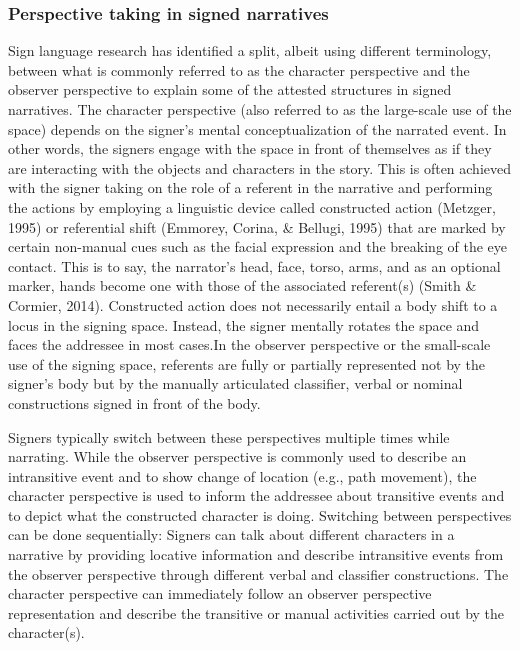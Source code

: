 \documentclass[
  english,
  doc,mask]{apa6}
\begin{document}
\hypertarget{perspective-taking-in-signed-narratives}{%
\subsubsection{Perspective taking in signed narratives}\label{perspective-taking-in-signed-narratives}}

Sign language research has identified a split, albeit using different terminology, between what is commonly referred to as the character perspective and the observer perspective to explain some of the attested structures in signed narratives. The character perspective (also referred to as the large-scale use of the space) depends on the signer's mental conceptualization of the narrated event. In other words, the signers engage with the space in front of themselves as if they are interacting with the objects and characters in the story. This is often achieved with the signer taking on the role of a referent in the narrative and performing the actions by employing a linguistic device called constructed action (Metzger, 1995) or referential shift (Emmorey, Corina, \& Bellugi, 1995) that are marked by certain non-manual cues such as the facial expression and the breaking of the eye contact. This is to say, the narrator's head, face, torso, arms, and as an optional marker, hands become one with those of the associated referent(s) (Smith \& Cormier, 2014). Constructed action does not necessarily entail a body shift to a locus in the signing space. Instead, the signer mentally rotates the space and faces the addressee in most cases.In the observer perspective or the small-scale use of the signing space, referents are fully or partially represented not by the signer's body but by the manually articulated classifier, verbal or nominal constructions signed in front of the body.

Signers typically switch between these perspectives multiple times while narrating. While the observer perspective is commonly used to describe an intransitive event and to show change of location (e.g., path movement), the character perspective is used to inform the addressee about transitive events and to depict what the constructed character is doing. Switching between perspectives can be done sequentially: Signers can talk about different characters in a narrative by providing locative information and describe intransitive events from the observer perspective through different verbal and classifier constructions. The character perspective can immediately follow an observer perspective representation and describe the transitive or manual activities carried out by the character(s).
\end{document}
